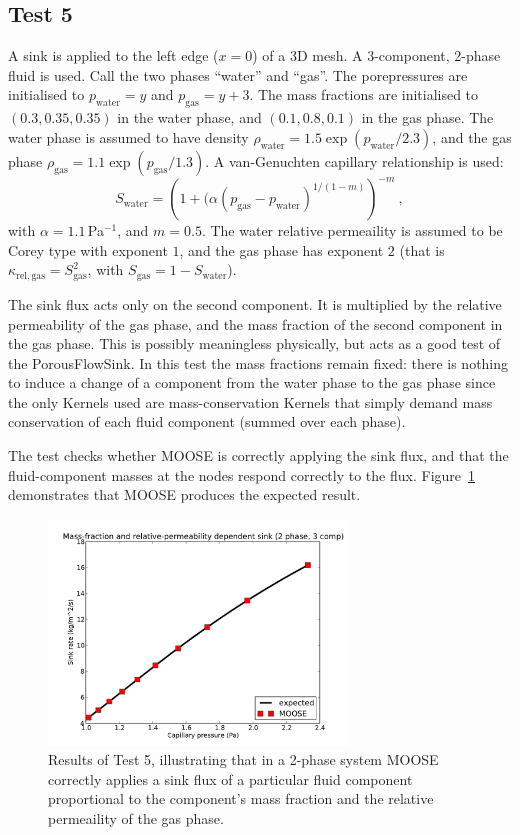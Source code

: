 \documentclass[]{scrreprt}
\begin{document}
\subsection{Test 5}

A sink is applied to the left edge ($x=0$) of a 3D mesh.  A
3-component, 2-phase fluid is used.  Call the two phases ``water'' and
``gas''.  The porepressures are initialised to $p_{\mathrm{water}} =
y$ and $p_{\mathrm{gas}} = y + 3$.  The mass fractions are initialised
to $(0.3, 0.35, 0.35)$ in the water phase, and $(0.1, 0.8, 0.1)$ in
the gas phase.  The water phase is assumed to have density
$\rho_{\mathrm{water}} = 1.5 \exp(p_{\mathrm{water}}/2.3)$, and the gas phase
$\rho_{\mathrm{gas}} = 1.1 \exp(p_{\mathrm{gas}}/1.3)$.  A van-Genuchten capillary
relationship is used:
\begin{equation}
S_{\mathrm{water}} = \left( 1 + (\alpha (p_{\mathrm{gas}} - p_{\mathrm{water}})^{1/(1-m)} \right)^{-m} \ ,
\end{equation}
with $\alpha = 1.1$\,Pa$^{-1}$, and $m=0.5$.  The water relative
permeaility is assumed to be Corey type with exponent $1$, and the gas
phase has exponent $2$ (that is $\kappa_{\mathrm{rel,gas}} =
S_{\mathrm{gas}}^{2}$, with $S_{\mathrm{gas}} = 1 -
S_{\mathrm{water}}$).

The sink flux acts only on the second component.  It is multiplied by the
relative permeability of the gas phase, and the mass fraction of the
second component in the gas phase.  This is possibly meaningless
physically, but acts as a good test of the PorousFlowSink.  In this
test the mass fractions remain fixed: there is nothing to induce a
change of a component from the water phase to the gas phase since the
only Kernels used are mass-conservation Kernels that simply demand
mass conservation of each fluid component (summed over each phase).

The test checks whether MOOSE is correctly applying the sink flux, and
that the fluid-component masses at the nodes respond correctly to the
flux.  Figure~\ref{s08.fig} demonstrates that MOOSE produces the
expected result.

\begin{figure}[htb]
\begin{center}
\includegraphics[width=8cm]{s08.pdf}
\caption{Results of Test 5, illustrating that in a 2-phase system
  MOOSE correctly applies a sink flux of a particular fluid component
  proportional to the component's mass fraction and the relative
  permeaility of the gas phase.}
\label{s08.fig}
\end{center}
\end{figure}
\end{document}
